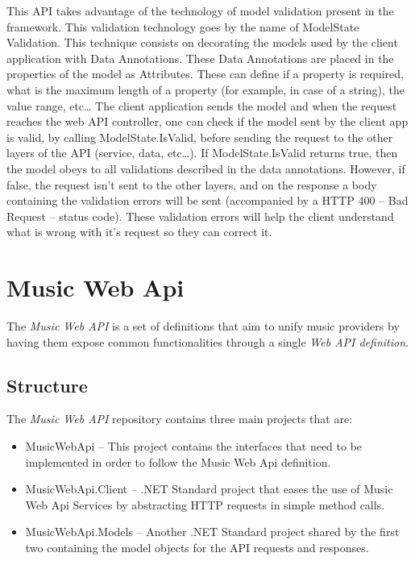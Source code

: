 This API takes advantage of the technology of model validation present in the framework. This validation technology goes by the name of ModelState Validation. This technique consists on decorating the models used by the client application with Data Annotations.
These Data Annotations are placed in the properties of the model as Attributes. These can define if a property is required, what is the maximum length of a property (for example, in case of a string), the value range, etc…
The client application sends the model and when the request reaches the web API controller, one can check if the model sent by the client app is valid, by calling ModelState.IsValid, before sending the request to the other layers of the API (service, data, etc…).
If ModelState.IsValid returns true, then the model obeys to all validations described in the data annotations. However, if false, the request isn’t sent to the other layers, and on the response a body containing the validation errors will be sent (accompanied by a HTTP 400 – Bad Request – status code). These validation errors will help the client understand what is wrong with it’s request so they can correct it.

\section{Music Web Api}

The \textit{Music Web API} is a set of definitions that aim to unify music providers by having them expose common functionalities through a single \textit{Web API definition}.

\subsection{Structure}
The \textit{Music Web API} repository contains three main projects that are:

\begin{itemize}
	\item MusicWebApi – This project contains the interfaces that need to be implemented in order to follow the Music Web Api definition.
	
	\item MusicWebApi.Client – .NET Standard project that eases the use of Music Web Api Services by abstracting HTTP requests in simple method calls.
	
	\item MusicWebApi.Models – Another .NET Standard project shared by the first two containing the model objects for the API requests and responses.
\end{itemize}

